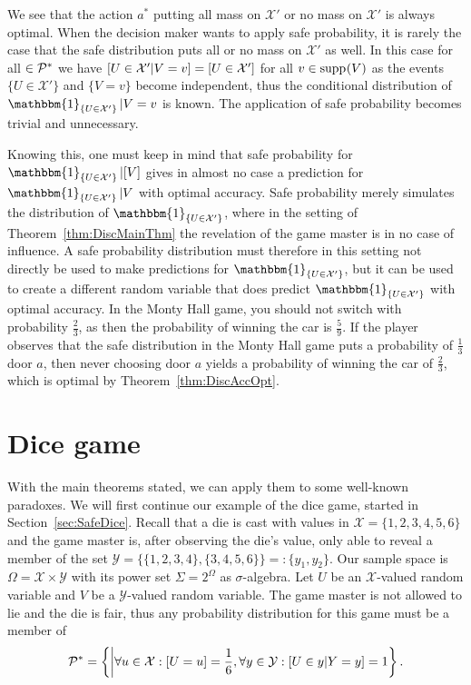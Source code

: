 \documentclass[a4paper]{report}
\theoremstyle{plain}
\theoremstyle{definition}
\theoremstyle{remark}
\numberwithin{equation}{chapter}
\let\P\relax
\DeclareMathOperator{\P}{\mathbb{P}}
\DeclareMathOperator{\1}{\mathbbm{1}}
\newcommand{\X}{\mathcal{X}}
\newcommand{\Y}{\mathcal{Y}}
\DeclareMathOperator{\supp}{supp}
\newcommand{\Pmod}{\mathcal{P}^*}
\newcommand{\GeneralGenInd}{\1_{\{U\in\X'\}}}
\begin{document}
We see that the action $a^*$ putting all mass on $\X'$ or no mass on $\X'$ is always optimal. When the decision maker wants to apply safe probability, it is rarely the case that the safe distribution puts all or no mass on $\X'$ as well. In this case for all $\P\in\Pmod$ we have $\P[U\in\X'|V=v]=\P[U\in\X']$ for all $v\in\supp_{\P}(V)$ as the events $\{U\in\X'\}$ and $\{V=v\}$ become independent, thus the conditional distribution of $\GeneralGenInd|V=v$ is known. The application of safe probability becomes trivial and unnecessary.

Knowing this, one must keep in mind that safe probability for $\GeneralGenInd|[V]$ gives in almost no case a prediction for $\GeneralGenInd|V$ with optimal accuracy. Safe probability merely simulates the distribution of $\GeneralGenInd$, where in the setting of Theorem~\ref{thm:DiscMainThm} the revelation of the game master is in no case of influence. A safe probability distribution must therefore in this setting not directly be used to make predictions for $\GeneralGenInd$, but it can be used to create a different random variable that does predict $\GeneralGenInd$ with optimal accuracy. In the Monty Hall game, you should not switch with probability $\frac{2}{3}$, as then the probability of winning the car is $\frac{5}{9}$. If the player observes that the safe distribution in the Monty Hall game puts a probability of $\frac{1}{3}$ door $a$, then never choosing door $a$ yields a probability of winning the car of $\frac{2}{3}$, which is optimal by Theorem~\ref{thm:DiscAccOpt}.

\section{Dice game}\label{sec:DiscDice}
With the main theorems stated, we can apply them to some well-known paradoxes. We will first continue our example of the dice game, started in Section~\ref{sec:SafeDice}. Recall that a die is cast with values in $\X=\{1,2,3,4,5,6\}$ and the game master is, after observing the die's value, only able to reveal a member of the set $\Y=\{\{1,2,3,4\},\{3,4,5,6\}\}=:\{y_1,y_2\}$. Our sample space is $\Omega=\X\times\Y$ with its power set $\Sigma=2^\Omega$ as $\sigma$-algebra. Let $U$ be an $\X$-valued random variable and $V$ be a $\Y$-valued random variable. The game master is not allowed to lie and the die is fair, thus any probability distribution for this game must be a member of \begin{equation}
\Pmod=\left\{\P\middle|\forall u\in\X:\P[U=u]=\frac{1}{6},\forall y\in\Y:\P[U\in y|Y=y]=1\right\}.
\end{equation}
\end{document}
